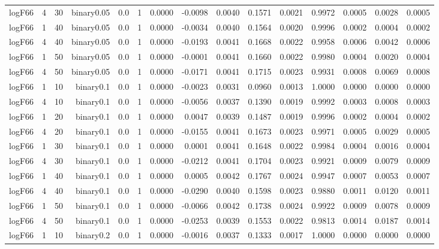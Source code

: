 \begin{longtable}{rrrrrrrrrrrrrrr}
  logF66 & 4 & 30 & binary0.05 & 0.0 & 1 & 0.0000 & -0.0098 & 0.0040 & 0.1571 & 0.0021 & 0.9972 & 0.0005 & 0.0028 & 0.0005 \\ 
  logF66 & 1 & 40 & binary0.05 & 0.0 & 1 & 0.0000 & -0.0034 & 0.0040 & 0.1564 & 0.0020 & 0.9996 & 0.0002 & 0.0004 & 0.0002 \\ 
  logF66 & 4 & 40 & binary0.05 & 0.0 & 1 & 0.0000 & -0.0193 & 0.0041 & 0.1668 & 0.0022 & 0.9958 & 0.0006 & 0.0042 & 0.0006 \\ 
  logF66 & 1 & 50 & binary0.05 & 0.0 & 1 & 0.0000 & -0.0001 & 0.0041 & 0.1660 & 0.0022 & 0.9980 & 0.0004 & 0.0020 & 0.0004 \\ 
  logF66 & 4 & 50 & binary0.05 & 0.0 & 1 & 0.0000 & -0.0171 & 0.0041 & 0.1715 & 0.0023 & 0.9931 & 0.0008 & 0.0069 & 0.0008 \\ 
  logF66 & 1 & 10 & binary0.1 & 0.0 & 1 & 0.0000 & -0.0023 & 0.0031 & 0.0960 & 0.0013 & 1.0000 & 0.0000 & 0.0000 & 0.0000 \\ 
  logF66 & 4 & 10 & binary0.1 & 0.0 & 1 & 0.0000 & -0.0056 & 0.0037 & 0.1390 & 0.0019 & 0.9992 & 0.0003 & 0.0008 & 0.0003 \\ 
  logF66 & 1 & 20 & binary0.1 & 0.0 & 1 & 0.0000 & 0.0047 & 0.0039 & 0.1487 & 0.0019 & 0.9996 & 0.0002 & 0.0004 & 0.0002 \\ 
  logF66 & 4 & 20 & binary0.1 & 0.0 & 1 & 0.0000 & -0.0155 & 0.0041 & 0.1673 & 0.0023 & 0.9971 & 0.0005 & 0.0029 & 0.0005 \\ 
  logF66 & 1 & 30 & binary0.1 & 0.0 & 1 & 0.0000 & 0.0001 & 0.0041 & 0.1648 & 0.0022 & 0.9984 & 0.0004 & 0.0016 & 0.0004 \\ 
  logF66 & 4 & 30 & binary0.1 & 0.0 & 1 & 0.0000 & -0.0212 & 0.0041 & 0.1704 & 0.0023 & 0.9921 & 0.0009 & 0.0079 & 0.0009 \\ 
  logF66 & 1 & 40 & binary0.1 & 0.0 & 1 & 0.0000 & 0.0005 & 0.0042 & 0.1767 & 0.0024 & 0.9947 & 0.0007 & 0.0053 & 0.0007 \\ 
  logF66 & 4 & 40 & binary0.1 & 0.0 & 1 & 0.0000 & -0.0290 & 0.0040 & 0.1598 & 0.0023 & 0.9880 & 0.0011 & 0.0120 & 0.0011 \\ 
  logF66 & 1 & 50 & binary0.1 & 0.0 & 1 & 0.0000 & -0.0066 & 0.0042 & 0.1738 & 0.0024 & 0.9922 & 0.0009 & 0.0078 & 0.0009 \\ 
  logF66 & 4 & 50 & binary0.1 & 0.0 & 1 & 0.0000 & -0.0253 & 0.0039 & 0.1553 & 0.0022 & 0.9813 & 0.0014 & 0.0187 & 0.0014 \\ 
  logF66 & 1 & 10 & binary0.2 & 0.0 & 1 & 0.0000 & -0.0016 & 0.0037 & 0.1333 & 0.0017 & 1.0000 & 0.0000 & 0.0000 & 0.0000 \\ 

\end{longtable}
